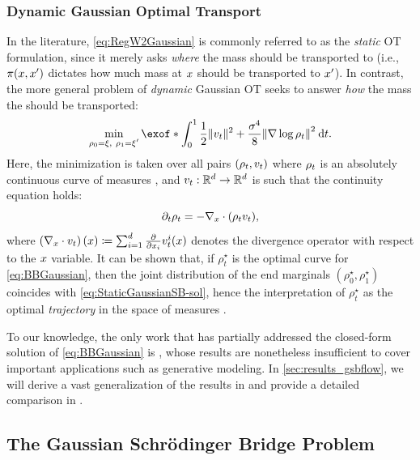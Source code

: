 \subsubsection{Dynamic Gaussian Optimal Transport}
\label{sec:dynamicGOT-BB}


In the literature, \eqref{eq:RegW2Gaussian} is commonly referred to as the \emph{static} \acrshort{OT} formulation, since it merely asks \emph{where} the mass should be transported to (i.e., $\pi(x,x')$ dictates how much mass at $x$ should be transported to $x'$). In contrast, the more general problem of \emph{dynamic} Gaussian \acrshort{OT} seeks to answer \emph{how} the mass the should be transported:
\begin{align}
\label{eq:BBGaussian}
\min_{\ssstyle\substack{{\measure[0] = \xi,\ \measure[\horizon] = \xi'}}} \exof*{\int_{0}^\horizon  \frac{1}{2} \norm{\vect}^2 + \frac{\sigma^4}{8} \norm*{\nabla\log\measure}^2 \dt}.
\end{align}Here, the minimization is taken over all pairs $(\rho_{t}, v_t)$ where $\rho_{t}$ is an absolutely continuous curve of measures \citep{ambrosio2006gradient}, and $v_t:\mathbb{R}^d\to\mathbb{R}^d$ is such that the continuity equation holds:
\begin{equation}
\label{eq:Coneq}
\partial_{t}\rho_{t} = - \nabla_{ {x} } \cdot(\rho_{t} v_t),
\end{equation}
where $\left(\nabla_{ {x} } \cdot v_t\right)(x) \coloneqq \sum_{i=1}^d \frac{\partial}{\partial x_i}v_t^{i}(x)$ denotes the divergence operator with respect to the $x$ variable. It can be shown that, if $\rho^\star_t$ is the optimal curve for \eqref{eq:BBGaussian}, then the joint distribution of the end marginals $(\rho^\star_0, \rho_1^\star)$ coincides with \eqref{eq:StaticGaussianSB-sol}, hence the interpretation of $\rho_t^\star$ as the optimal \emph{trajectory} in the space of measures  \citep{chen2016relation, gentil2017analogy, chen2021stochastic, gentil2020dynamical}.

To our knowledge, the only work that has partially addressed the closed-form solution of \eqref{eq:BBGaussian} is \citet{mallasto2021entropy}, whose results are nonetheless insufficient to cover important applications such as generative modeling. In \cref{sec:results_gsbflow}, we will derive a vast generalization of the results in \citet{mallasto2021entropy} and provide a detailed comparison in .


\subsection{The Gaussian Schr\"odinger Bridge Problem}
\label{sec:overview_gsbflow}


